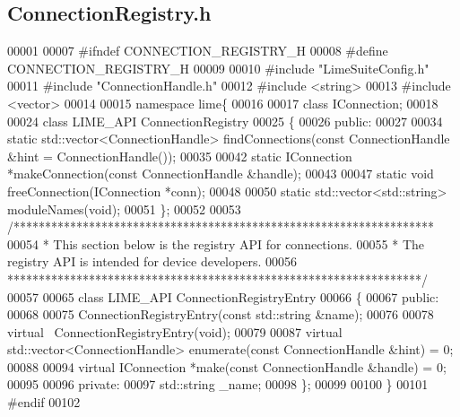 \subsection{Connection\+Registry.\+h}
\label{ConnectionRegistry_8h_source}

\begin{DoxyCode}
00001 
00007 \textcolor{preprocessor}{#ifndef CONNECTION\_REGISTRY\_H}
00008 \textcolor{preprocessor}{#define CONNECTION\_REGISTRY\_H}
00009 
00010 \textcolor{preprocessor}{#include "LimeSuiteConfig.h"}
00011 \textcolor{preprocessor}{#include "ConnectionHandle.h"}
00012 \textcolor{preprocessor}{#include <string>}
00013 \textcolor{preprocessor}{#include <vector>}
00014 
00015 \textcolor{keyword}{namespace }lime\{
00016 
00017 \textcolor{keyword}{class }IConnection;
00018 
00024 \textcolor{keyword}{class }LIME_API ConnectionRegistry
00025 \{
00026 \textcolor{keyword}{public}:  
00027 
00034     \textcolor{keyword}{static} std::vector<ConnectionHandle> findConnections(\textcolor{keyword}{const} ConnectionHandle &hint = 
      ConnectionHandle());
00035 
00042     \textcolor{keyword}{static} IConnection *makeConnection(\textcolor{keyword}{const} ConnectionHandle &handle);
00043 
00047     \textcolor{keyword}{static} \textcolor{keywordtype}{void} freeConnection(IConnection *conn);
00048 
00050     \textcolor{keyword}{static} std::vector<std::string> moduleNames(\textcolor{keywordtype}{void});
00051 \};
00052     
00053 \textcolor{comment}{/*******************************************************************}
00054 \textcolor{comment}{ * This section below is the registry API for connections.}
00055 \textcolor{comment}{ * The registry API is intended for device developers.}
00056 \textcolor{comment}{ ******************************************************************/}
00057 
00065 \textcolor{keyword}{class }LIME_API ConnectionRegistryEntry
00066 \{
00067 \textcolor{keyword}{public}:
00068 
00075     ConnectionRegistryEntry(\textcolor{keyword}{const} std::string &name);
00076 
00078     \textcolor{keyword}{virtual} ~ConnectionRegistryEntry(\textcolor{keywordtype}{void});
00079 
00087     \textcolor{keyword}{virtual} std::vector<ConnectionHandle> enumerate(\textcolor{keyword}{const} ConnectionHandle &hint) = 0;
00088 
00094     \textcolor{keyword}{virtual} IConnection *make(\textcolor{keyword}{const} ConnectionHandle &handle) = 0;
00095 
00096 \textcolor{keyword}{private}:
00097     std::string _name;
00098 \};
00099 
00100 \}
00101 \textcolor{preprocessor}{#endif}
00102 
\end{DoxyCode}
